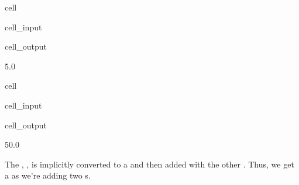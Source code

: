 \documentclass[letterpaper,10pt,english]{jupyterBook}
\begin{document}
\begin{sphinxuseclass}{cell}\begin{sphinxVerbatimInput}

\begin{sphinxuseclass}{cell_input}
\begin{sphinxVerbatim}[commandchars=\\\{\}]
  
\end{sphinxVerbatim}

\end{sphinxuseclass}\end{sphinxVerbatimInput}
\begin{sphinxVerbatimOutput}

\begin{sphinxuseclass}{cell_output}
\begin{sphinxVerbatim}[commandchars=\\\{\}]
5.0
\end{sphinxVerbatim}

\end{sphinxuseclass}\end{sphinxVerbatimOutput}

\end{sphinxuseclass}
\begin{sphinxuseclass}{cell}\begin{sphinxVerbatimInput}

\begin{sphinxuseclass}{cell_input}
\begin{sphinxVerbatim}[commandchars=\\\{\}]
  
\end{sphinxVerbatim}

\end{sphinxuseclass}\end{sphinxVerbatimInput}
\begin{sphinxVerbatimOutput}

\begin{sphinxuseclass}{cell_output}
\begin{sphinxVerbatim}[commandchars=\\\{\}]
50.0
\end{sphinxVerbatim}

\end{sphinxuseclass}\end{sphinxVerbatimOutput}

\end{sphinxuseclass}
\sphinxAtStartPar
The , , is implicitly converted to a  and then added with the other .
Thus, we get a  as we’re adding two s.
\end{document}

